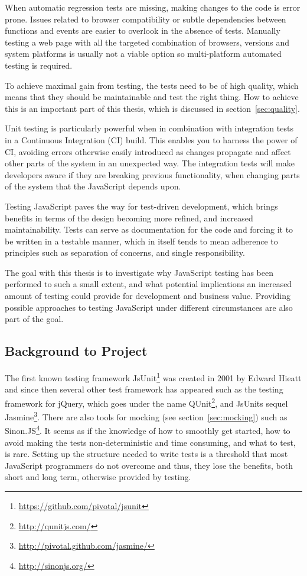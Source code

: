 \documentclass[11pt]{article}
\begin{document}
When automatic regression tests are missing, making changes to the code is error prone. Issues related to browser compatibility or subtle dependencies between functions and events are easier to overlook in the absence of tests. Manually testing a web page with all the targeted combination of browsers, versions and system platforms is usually not a viable option \cite{TestSwarm} so multi-platform automated testing is required. %

To achieve maximal gain from testing, the tests need to be of high quality, which means that they should be maintainable and test the right thing. How to achieve this is an important part of this thesis, which is discussed in section~\ref{sec:quality}.

Unit testing is particularly powerful when in combination with integration tests in a Continuous Integration (CI) build. This enables you to harness the power of CI, avoiding errors otherwise easily introduced as changes propagate and affect other parts of the system in an unexpected way. The integration tests will make developers aware if they are breaking previous functionality, when changing parts of the system that the JavaScript depends upon.

Testing JavaScript paves the way for test-driven development, which brings benefits in terms of the design becoming more refined, and increased maintainability. Tests can serve as documentation for the code and forcing it to be written in a testable manner, which in itself tends to mean adherence to principles such as separation of concerns, and single responsibility.

The goal with this thesis is to investigate why JavaScript testing has been performed to such a small extent, and what potential implications an increased amount of testing could provide for development and business value. Providing possible approaches to testing JavaScript under different circumstances are also part of the goal. %

\subsection{Background to Project}

The first known testing framework JsUnit\footnote{\url{https://github.com/pivotal/jsunit}} was created in 2001 by Edward Hieatt \cite{GoingFaster} and since then several other test framework has appeared such as the testing framework for jQuery, which goes under the name QUnit\footnote{\url{http://qunitjs.com/}}, and JsUnits sequel Jasmine\footnote{\url{http://pivotal.github.com/jasmine/}}. There are also tools for mocking (see section~\ref{sec:mocking}) such as Sinon.JS\footnote{\url{http://sinonjs.org/}}. It seems as if the knowledge of how to smoothly get started, how to avoid making the tests non-deterministic and time consuming, and what to test, is rare. Setting up the structure needed to write tests is a threshold that most JavaScript programmers do not overcome \cite{TestingStatistics} and thus, they lose the benefits, both short and long term, otherwise provided by testing.
\end{document}
